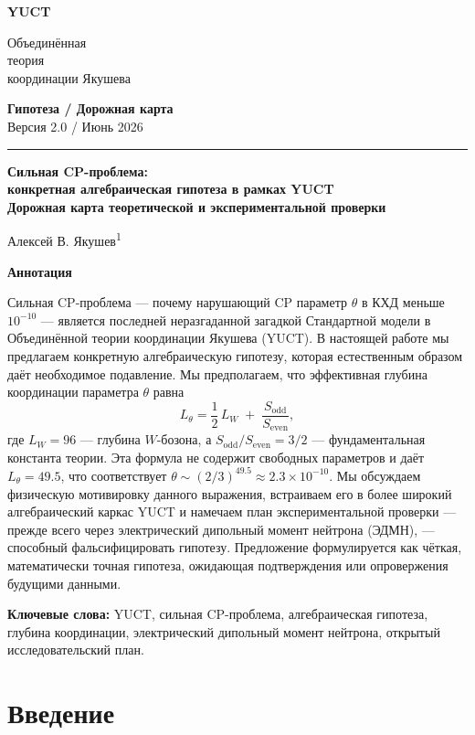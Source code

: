 \documentclass[11pt,a4paper]{article}
\newcommand{\makeheader}{%
	\noindent
	\begin{minipage}{0.17\textwidth}
		\raggedright
		{\sffamily\bfseries\color{skyblue}\fontsize{46}{46}\selectfont YUCT}%
	\end{minipage}%
	\hspace{30pt}
	\begin{minipage}{0.32\textwidth}
		\raggedright
		{\sffamily\fontsize{11}{13}\selectfont Объединённая\\ теория\\ координации Якушева}%
	\end{minipage}%
	\hfill
	\begin{minipage}{0.38\textwidth}
		\raggedleft
		{\sffamily\bfseries Гипотеза / Дорожная карта}\\ 
		{\sffamily Версия 2.0 / Июнь 2026}\\ 
	\end{minipage}
	\par\vspace{5pt}
	\noindent\textcolor{gold}{\rule{\textwidth}{1.6pt}}
	\par\vspace{0pt}
}
\begin{document}
	\thispagestyle{firstpage}
	\makeheader
	
	\vspace{0cm}
	{\LARGE\bfseries Сильная CP-проблема:\\[0.1cm] конкретная алгебраическая гипотеза в рамках YUCT\\[0.2cm] \Large Дорожная карта теоретической и экспериментальной проверки \par}
	\vspace{0.2cm}
	
	{\large Алексей В. Якушев\textsuperscript{1}} \\
	\vspace{0.0cm}
	
	{\color{darkblue}\textbf{\LARGE Аннотация}} \par
	{\large
		\noindent
		Сильная CP-проблема — почему нарушающий CP параметр \(\theta\) в КХД меньше \(10^{-10}\) — является последней неразгаданной загадкой Стандартной модели в Объединённой теории координации Якушева (YUCT). В настоящей работе мы предлагаем конкретную алгебраическую гипотезу, которая естественным образом даёт необходимое подавление. Мы предполагаем, что эффективная глубина координации параметра \(\theta\) равна
		\[
		L_\theta = \frac{1}{2}\,L_W \;+\; \frac{S_{\mathrm{odd}}}{S_{\mathrm{even}}},
		\]
		где \(L_W = 96\) — глубина \(W\)-бозона, а \(S_{\mathrm{odd}}/S_{\mathrm{even}} = 3/2\) — фундаментальная константа теории. Эта формула не содержит свободных параметров и даёт \(L_\theta = 49.5\), что соответствует \(\theta \sim (2/3)^{49.5} \approx 2.3 \times 10^{-10}\). Мы обсуждаем физическую мотивировку данного выражения, встраиваем его в более широкий алгебраический каркас YUCT и намечаем план экспериментальной проверки — прежде всего через электрический дипольный момент нейтрона (ЭДМН), — способный фальсифицировать гипотезу. Предложение формулируется как чёткая, математически точная гипотеза, ожидающая подтверждения или опровержения будущими данными.
	}
	
	\vspace{0.1cm}
	\noindent
	{\color{darkblue}\textbf{Ключевые слова:}} YUCT, сильная CP-проблема, алгебраическая гипотеза, глубина координации, электрический дипольный момент нейтрона, открытый исследовательский план.
	\vspace{0.4cm}
	
	\clearpage
	\tableofcontents
	\newpage
	
	\section{Введение}
	\label{sec:intro}
	
\end{document}
